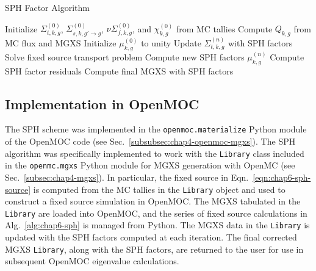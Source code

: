 \begin{algorithm}[h]
\caption{SPH Factor Algorithm}
\label{alg:chap6-sph}
\begin{algorithmic}[1]
  \State Initialize $\Sigma_{t,k,g}^{(0)}$, $\Sigma_{s,k,g'\rightarrow g}^{(0)}$, $\nu\Sigma_{f,k,g}^{(0)}$, and $\chi_{k,g}^{(0)}$ from MC tallies 
  \State Compute $Q_{k,g}$ from MC flux and \ac{MGXS} 
  \State Initialize $\mu_{k,g}^{(0)}$ to unity
    \State Update $\Sigma_{t,k,g}^{(n)}$ with \ac{SPH} factors 
    \State Solve fixed source transport problem\footnotemark {}
    \State Compute new \ac{SPH} factors $\mu_{k,g}^{(n)}$ 
    \State Compute \ac{SPH} factor residuals 
  \EndWhile
  \State Compute final \ac{MGXS} with \ac{SPH} factors 
\end{algorithmic}
\end{algorithm}


\subsection{Implementation in OpenMOC}
\label{subsec:chap6-sph-openmoc}

The \ac{SPH} scheme was implemented in the \texttt{openmoc.materialize} Python module of the OpenMOC code (see Sec.~\ref{subsubsec:chap4-openmoc-mgxs}). The \ac{SPH} algorithm was specifically implemented to work with the \texttt{Library} class included in the \texttt{openmc.mgxs} Python module for \ac{MGXS} generation with OpenMC (see Sec.~\ref{subsec:chap4-mgxs}). In particular, the fixed source in Eqn.~\ref{eqn:chap6-sph-source} is computed from the \ac{MC} tallies in the \texttt{Library} object and used to construct a fixed source simulation in OpenMOC. The \ac{MGXS} tabulated in the \texttt{Library} are loaded into OpenMOC, and the series of fixed source calculations in Alg.~\ref{alg:chap6-sph} is managed from Python. The \ac{MGXS} data in the \texttt{Library} is updated with the \ac{SPH} factors computed at each iteration. The final corrected \ac{MGXS} \texttt{Library}, along with the \ac{SPH} factors, are returned to the user for use in subsequent OpenMOC eigenvalue calculations.

